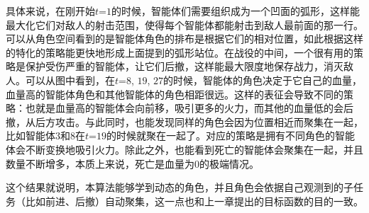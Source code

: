 具体来说，在刚开始$t$=$1$的时候，智能体们需要组织成为一个凹面的弧形，这样能最大化它们对敌人的射击范围，使得每个智能体都能射击到敌人最前面的那一行。可以从角色空间看到的是智能体角色的排布是根据它们的相对位置，如此根据这样的特化的策略能更快地形成上面提到的弧形站位。在战役的中间，一个很有用的策略是保护受伤严重的智能体，让它们后撤，这样能最大限度地保存战力，消灭敌人。可以从图中看到，在$t$=$8$, $19$, $27$的时候，智能体的角色决定于它自己的血量，血量高的智能体角色和其他智能体的角色相距很远。这样的表征会导致不同的策略：也就是血量高的智能体会向前移，吸引更多的火力，而其他的血量低的会后撤，从后方攻击。与此同时，也能发现同样的角色会因为位置相近而聚集在一起，比如智能体$3$和$8$在$t$=$19$的时候就聚在一起了。对应的策略是拥有不同角色的智能体会不断变换地吸引火力。除此之外，也能看到死亡的智能体会聚集在一起，并且数量不断增多，本质上来说，死亡是血量为$0$的极端情况。

这个结果就说明，本算法能够学到动态的角色，并且角色会依据自己观测到的子任务（比如前进、后撤）自动聚集，这一点也和上一章提出的目标函数的目的一致。

